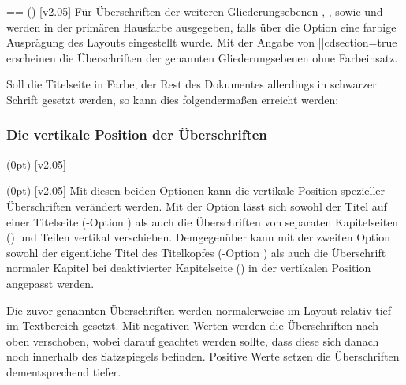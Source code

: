 \begin{DeclareEntity*}{}
\begin{DeclareEntity*}{}
\begin{DeclareEntity*}{}
\begin{Declaration}
  {}=\cdalias=
  ()
  [v2.05]
\printdeclarationlist
%
Für Überschriften der weiteren Gliederungsebenen , 
,  sowie  und 
 werden in der primären Hausfarbe  ausgegeben, 
falls über die Option  eine farbige Ausprägung des Layouts 
eingestellt wurde. Mit der Angabe von \Option||{cdsection=true} erscheinen die 
Überschriften der genannten Gliederungsebenen ohne Farbeinsatz.%
%
\end{Declaration}
%
\begin{Example}
Soll die Titelseite in Farbe, der Rest des Dokumentes allerdings in schwarzer 
Schrift gesetzt werden, so kann dies folgendermaßen erreicht werden:
\end{Example}



\subsubsection{Die vertikale Position der Überschriften}
%
\begin{Declaration}
  {}
  (0pt)
  [v2.05]
\begin{Declaration}
  {}
  (0pt)
  [v2.05]
\printdeclarationlist
%
Mit diesen beiden Optionen kann die vertikale Position spezieller Überschriften 
verändert werden. Mit der Option  lässt sich sowohl 
der Titel auf einer Titelseite (\KOMAScript-Option ) als 
auch die Überschriften von separaten Kapitelseiten () 
und Teilen vertikal verschieben. Demgegenüber kann mit der zweiten Option 
 sowohl der eigentliche Titel des Titelkopfes 
(\KOMAScript-Option ) als auch die Überschrift normaler 
Kapitel bei deaktivierter Kapitelseite () in der 
vertikalen Position angepasst werden.

Die zuvor genannten Überschriften werden normalerweise im Layout relativ tief 
im Textbereich gesetzt. Mit negativen Werten werden die Überschriften nach oben 
verschoben, wobei darauf geachtet werden sollte, dass diese sich danach noch 
innerhalb des Satzspiegels befinden. Positive Werte setzen die Überschriften 
dementsprechend tiefer.%
%
\end{Declaration}
\end{Declaration}




\end{DeclareEntity*}
\end{DeclareEntity*}
\end{DeclareEntity*}

